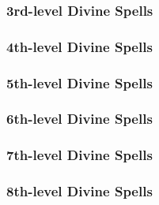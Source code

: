 \subsubsection{3rd-level Divine Spells}
\begin{spelllist}
    \SLagony
    \SLcalmemotions
    \SLcommand
    \SLdeathknell
    \SLdiscernvulnerability
    \SLdispelmagic
    \SLdivinefavor
    \SLmightythrow
\end{spelllist}

\subsubsection{4th-level Divine Spells}
\begin{spelllist}
    \SLairwalk
    \SLavatarofhealing
    \SLbladebarrier
    \SLconfusion
    \SLdeathward
    \SLenervation
    \SLmarkofscrying
    \SLpoison
\end{spelllist}

\subsubsection{5th-level Divine Spells}
\begin{spelllist}
    \SLblasphemy
    \SLcacaphonicword
    \SLcircleofdeath
    \SLcircleofhealing
    \SLcurseofthewaywardmind
    \SLdictum
    \SLdivinemight
    \SLflamestrike
    \SLholyword
    \SLrevivify
\end{spelllist}

\subsubsection{6th-level Divine Spells}
\begin{spelllist}
    \SLblessedblade
    \SLheal
    \SLtrueseeing
    \SLwordofrecall
\end{spelllist}

\subsubsection{7th-level Divine Spells}
\begin{spelllist}
    \SLantimagicfield
    \SLantilifeshell
    \SLavataroffealty
    \SLavatarofshielding
    \SLdivinejudgment
    \SLdivineshield
\end{spelllist}

\subsubsection{8th-level Divine Spells}
\begin{spelllist}
    \SLavatarofsuffering
    \SLmartyrsgift
\end{spelllist}

